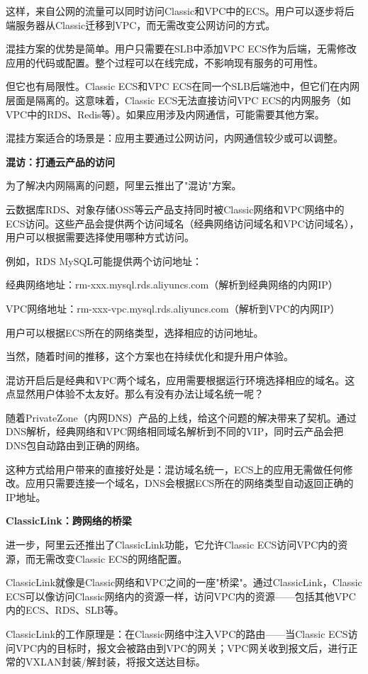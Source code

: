 这样，来自公网的流量可以同时访问Classic和VPC中的ECS。用户可以逐步将后端服务器从Classic迁移到VPC，而无需改变公网访问的方式。

混挂方案的优势是简单。用户只需要在SLB中添加VPC ECS作为后端，无需修改应用的代码或配置。整个过程可以在线完成，不影响现有服务的可用性。

但它也有局限性。Classic ECS和VPC ECS在同一个SLB后端池中，但它们在内网层面是隔离的。这意味着，Classic ECS无法直接访问VPC ECS的内网服务（如VPC中的RDS、Redis等）。如果应用涉及内网通信，可能需要其他方案。

混挂方案适合的场景是：应用主要通过公网访问，内网通信较少或可以调整。

\textbf{混访：打通云产品的访问}

为了解决内网隔离的问题，阿里云推出了"混访"方案。

云数据库RDS、对象存储OSS等云产品支持同时被Classic网络和VPC网络中的ECS访问。这些产品会提供两个访问域名（经典网络访问域名和VPC访问域名），用户可以根据需要选择使用哪种方式访问。

例如，RDS MySQL可能提供两个访问地址：

经典网络地址：rm-xxx.mysql.rds.aliyuncs.com（解析到经典网络的内网IP）

VPC网络地址：rm-xxx-vpc.mysql.rds.aliyuncs.com（解析到VPC的内网IP）

用户可以根据ECS所在的网络类型，选择相应的访问地址。

当然，随着时间的推移，这个方案也在持续优化和提升用户体验。

混访开启后是经典和VPC两个域名，应用需要根据运行环境选择相应的域名。这点显然用户体验不太友好。那么有没有办法让域名统一呢？

随着PrivateZone（内网DNS）产品的上线，给这个问题的解决带来了契机。通过DNS解析，经典网络和VPC网络相同域名解析到不同的VIP，同时云产品会把DNS包自动路由到正确的网络。

这种方式给用户带来的直接好处是：混访域名统一，ECS上的应用无需做任何修改。应用只需要连接一个域名，DNS会根据ECS所在的网络类型自动返回正确的IP地址。

\textbf{ClassicLink：跨网络的桥梁}

进一步，阿里云还推出了ClassicLink功能，它允许Classic ECS访问VPC内的资源，而无需改变Classic ECS的网络配置。

ClassicLink就像是Classic网络和VPC之间的一座"桥梁"。通过ClassicLink，Classic ECS可以像访问Classic网络内的资源一样，访问VPC内的资源——包括其他VPC内的ECS、RDS、SLB等。

ClassicLink的工作原理是：在Classic网络中注入VPC的路由——当Classic ECS访问VPC内的目标时，报文会被路由到VPC的网关；VPC网关收到报文后，进行正常的VXLAN封装/解封装，将报文送达目标。

